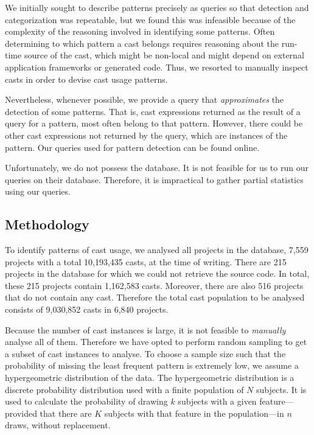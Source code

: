 We initially sought to describe patterns precisely as \ql{} queries so that
detection and categorization was repeatable,
but we found this was infeasible because of the
complexity of the reasoning involved in identifying some patterns.
Often determining to which pattern a cast belongs requires reasoning about the run-time source of the cast,
which might be non-local and might depend on external application frameworks or generated code.
Thus, we resorted to manually inspect casts in order to devise cast usage patterns.

Nevertheless, whenever possible,
we provide a \ql{} query that \emph{approximates} the detection of some patterns.
That is, cast expressions returned as the result of a \ql{} query for a pattern,
most often belong to that pattern.
However, there could be other cast expressions not returned by the query,
which are instances of the pattern.
Our \ql{} queries used for pattern detection can be found online.%

Unfortunately, we do not possess the \lgtm{} database.
It is not feasible for us to run our queries on their database.
Therefore, it is impractical to gather partial statistics using our queries.


\subsection{Methodology}

To identify patterns of cast usage, we analysed all \java{} projects in the \lgtm{} database, 7,559 projects
with a total 10,193,435 casts, at the time of writing.
There are 215 projects in the database for which we could not retrieve the source code.
In total, these 215 projects contain 1,162,583 casts.
Moreover, there are also 516 projects that do not contain any cast.
Therefore the total cast population to be analysed consists of 9,030,852 casts in 6,840 projects.

Because the number of cast instances is large, it is not feasible to \emph{manually} analyse all of them.
Therefore we have opted to perform random sampling to get a subset of cast instances to analyse.
To choose a sample size such that
the probability of missing the least frequent pattern is extremely low, we assume a
hypergeometric distribution of the data.
The hypergeometric distribution is a discrete probability distribution used with a finite population of $N$ subjects.
It is used to calculate the probability of drawing $k$ subjects with a given feature---provided that there are $K$ subjects with that feature in the population---in $n$ draws, without replacement.

